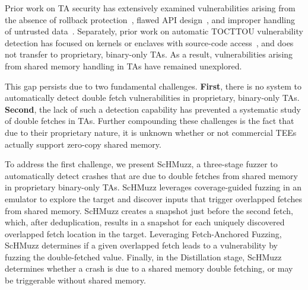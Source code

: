 \documentclass[conference]{IEEEtran}
\newcommand{\sysname}{ScHMuzz\xspace}
\newcommand{\stagetwo}{Fetch-Anchored Fuzzing\xspace}
\newcommand{\stagethree}{Distillation\xspace}
\begin{document}
Prior work on TA security has extensively examined vulnerabilities arising from 
the absence of rollback protection~\cite{rollback}, flawed API design~\cite{globalconfusion}, 
and improper handling of untrusted data~\cite{AdamskiGuilbonPeterlin2019SamsungTrustZone,teezz,trustdies}. 
Separately, prior work on automatic TOCTTOU vulnerability detection has focused on kernels 
or enclaves with source-code access~\cite{decaf,deadline,wang2017double,chen2024enclavefuzz}, 
and does not transfer to proprietary, binary-only TAs. 
As a result, vulnerabilities arising from shared memory handling in TAs have remained unexplored.

This gap persists due to two fundamental challenges. \textbf{First}, there is no system to 
automatically detect double fetch vulnerabilities in proprietary, binary-only TAs.
\textbf{Second}, the lack of such a detection capability has prevented a systematic study of
double fetches in TAs. Further compounding these challenges is the fact that due to their 
proprietary nature, it is unknown whether or not commercial TEEs actually support 
zero-copy shared memory. 

To address the first challenge, we present \sysname, a three-stage fuzzer to 
automatically detect crashes that are due to double fetches from shared memory in proprietary binary-only TAs. 
\sysname leverages coverage-guided fuzzing in an emulator to explore the target and 
discover inputs that trigger overlapped fetches from shared memory. \sysname creates 
a snapshot just before the second fetch, which, after deduplication, results in a 
snapshot for each uniquely discovered overlapped fetch location in the target.
Leveraging \stagetwo, \sysname determines if a given overlapped fetch leads 
to a vulnerability by fuzzing the double-fetched value. 
Finally, in the \stagethree stage, \sysname determines whether a crash is due to a 
shared memory double fetching, or may be triggerable without shared memory. 

\end{document}
